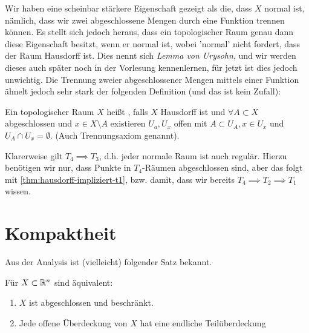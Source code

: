 \begin{remark*}
    Wir haben eine scheinbar stärkere Eigenschaft gezeigt als die, dass $X$ normal ist, nämlich, dass wir zwei abgeschlossene Mengen durch eine Funktion trennen können. Es stellt sich jedoch heraus, dass ein topologischer Raum genau dann diese Eigenschaft besitzt, wenn er normal ist, wobei 'normal' nicht fordert, dass der Raum Hausdorff ist. Dies nennt sich \textit{Lemma von Urysohn}, und wir werden dieses auch später noch in der Vorlesung kennenlernen, für jetzt ist dies jedoch unwichtig. Die Trennung zweier abgeschlossener Mengen mittels einer Funktion ähnelt jedoch sehr stark der folgenden Definition (und das ist kein Zufall):
\end{remark*}
\begin{definition}[Regulär]\label{def:regulär}
    Ein topologischer Raum $X$ heißt  , falls $X$ Hausdorff ist und  $\forall  A \subset X$ abgeschlossen und $x\in X \setminus A$ existieren $U_a, U_{x}$ offen mit $A\subset U_A, x\in U_x$ und $U_A \cap U_x = \emptyset$. (Auch Trennungsaxiom  genannt). \\
    \begin{minipage}{\textwidth}
        \centering
        \begin{minipage}{0.7\textwidth}
        \centering
        \end{minipage}
    \end{minipage}
\end{definition}

\begin{remark}
    Klarerweise gilt $T_4 \implies T_3$, d.h. jeder normale Raum ist auch regulär. Hierzu benötigen wir nur, dass Punkte in $T_4$-Räumen abgeschlossen sind, aber das folgt mit \autoref{thm:hausdorff-impliziert-t1}, bzw. damit, dass wir bereits $T_4 \implies T_2 \implies T_1$ wissen.
\end{remark}
\begin{figure}[ht]
    \centering
    \label{fig:regular-space}
\end{figure}


\section{Kompaktheit}
Aus der Analysis ist (vielleicht) folgender Satz bekannt.
\begin{theorem}\label{thm:heine-borel}
    Für $X\subset \mathbb{R}^n$ sind äquivalent:
    \begin{enumerate}[1)]
        \item $X$ ist abgeschlossen und beschränkt.
        \item Jede offene Überdeckung von $X$ hat eine endliche Teilüberdeckung
    \end{enumerate}
\end{theorem}

